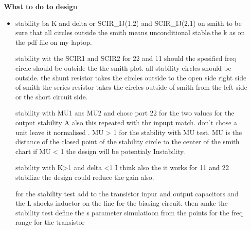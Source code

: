 \documentclass{article}
\begin{document}
\textbf{What to do to design}
\begin{itemize}
    \item stability ba K and delta  or SCIR_IJ(1,2) and SCIR_IJ(2,1) on smith to be sure that all circles outside the smith means unconditional stable.the k as on the pdf file on my laptop.
    
    stability wit the SCIR1 and SCIR2  for 22 and 11  should the spesified freq circle should be outside the the smith plot.
    all stability circles should be outside.
    the shunt resistor takes the circles outside to the open side right side of smith
    the series resistor takes the circles outside of smith from the left side  or the short circuit side.



    stability with  MU1 ans MU2  and chose port 22  for the two values for the output stability A
    also this repeated with thr inpupt match. don't chose a unit leave it normalised .
     MU > 1 for the stability with MU test.
     MU is the distance of the closed point of the stability circle to the center of the smith chart
     if MU < 1  the design will be potentialy Instability.


     stability with K>1 and delta <1 I think also the it works for 11 and 22 
     stabilize the design could reduce the gain also.


     for the stability test add to the transistor inpur and output capacitors and the L shocks inductor on the line for the biasing circuit.
     then amke the stability test
     define the s parameter simulatioon from the points for the freq range for the transistor 
     

\end{itemize}
\end{document}

